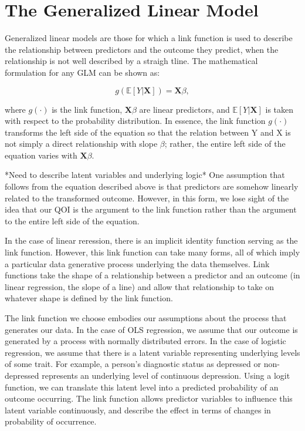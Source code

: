 \documentclass[jou, apacite]{apa6}
\begin{document}
\section{The Generalized Linear Model}
Generalized linear models are those for which a link function is used to describe the relationship between predictors and the outcome they predict, when the relationship is not well described by a straigh tline. 
The mathematical formulation for any GLM can be shown as:

\begin{equation}
g(\mathbb{E}[Y|\bm{X}]) = \bm{X} \beta ,
\end{equation}

where $g(\cdot)$ is the link function, $\bm{X}\beta$ are linear predictors, and $\mathbb{E}[Y|\bm{X}]$ is taken with respect to the probability distribution. In essence, the link function $g(\cdot)$ transforms the left side of the equation so that the relation between Y and X is not simply a direct relationship with slope $\beta$; rather, the entire left side of the equation varies with $\bm{X}\beta$.

*Need to describe latent variables and underlying logic*
One assumption that follows from the equation described above is that predictors are somehow linearly related to the transformed outcome.	
However, in this form, we lose sight of the idea that our QOI is the argument to the link function rather than the argument to the entire left side of the equation.

In the case of linear reression, there is an implicit identity function serving as the link function.
However, this link function can take many forms, all of which imply a particular data generative process underlying the data themselves.
Link functions take the shape of a relationship between a predictor and an outcome (in linear regression, the slope of a line) and allow that relationship to take on whatever shape is defined by the link function.

The link function we choose embodies our assumptions about the process that generates our data.
In the case of OLS regression, we assume that our outcome is generated by a process with normally distributed errors.
In the case of logistic regression, we assume that there is a latent variable representing underlying levels of some trait. 
For example, a person's diagnostic status as depressed or non-depressed represents an underlying level of continuous depression. 
Using a logit function, we can translate this latent level into a predicted probability of an outcome occurring.
The link function allows predictor variables to influence this latent variable continuously, and describe the effect in terms of changes in probability of occurrence.
\end{document}

